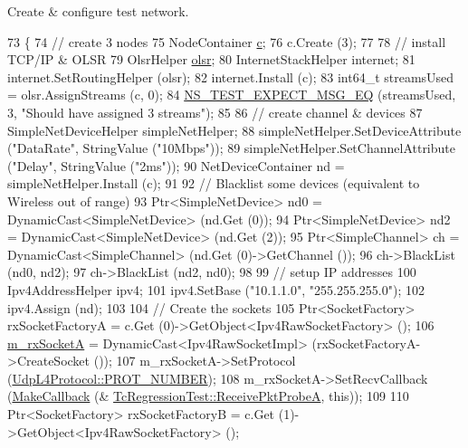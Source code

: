 Create \& configure test network. 


\begin{DoxyCode}
73 \{
74   \textcolor{comment}{// create 3 nodes}
75   NodeContainer \hyperlink{lte_2model_2fading-traces_2fading__trace__generator_8m_ae0323a9039add2978bf5b49550572c7c}{c};
76   c.Create (3);
77 
78   \textcolor{comment}{// install TCP/IP & OLSR}
79   OlsrHelper \hyperlink{namespaceolsr}{olsr};
80   InternetStackHelper internet;
81   internet.SetRoutingHelper (olsr);
82   internet.Install (c);
83   int64\_t streamsUsed = olsr.AssignStreams (c, 0);
84   \hyperlink{group__testing_ga7304ba46a28d8cf08dfdfd6499cf7068}{NS\_TEST\_EXPECT\_MSG\_EQ} (streamsUsed, 3, \textcolor{stringliteral}{"Should have assigned 3 streams"});
85 
86   \textcolor{comment}{// create channel & devices}
87   SimpleNetDeviceHelper simpleNetHelper;
88   simpleNetHelper.SetDeviceAttribute (\textcolor{stringliteral}{"DataRate"}, StringValue (\textcolor{stringliteral}{"10Mbps"}));
89   simpleNetHelper.SetChannelAttribute (\textcolor{stringliteral}{"Delay"}, StringValue (\textcolor{stringliteral}{"2ms"}));
90   NetDeviceContainer nd = simpleNetHelper.Install (c);
91 
92   \textcolor{comment}{// Blacklist some devices (equivalent to Wireless out of range)}
93   Ptr<SimpleNetDevice> nd0 = DynamicCast<SimpleNetDevice> (nd.Get (0));
94   Ptr<SimpleNetDevice> nd2 = DynamicCast<SimpleNetDevice> (nd.Get (2));
95   Ptr<SimpleChannel> ch = DynamicCast<SimpleChannel> (nd.Get (0)->GetChannel ());
96   ch->BlackList (nd0, nd2);
97   ch->BlackList (nd2, nd0);
98 
99   \textcolor{comment}{// setup IP addresses}
100   Ipv4AddressHelper ipv4;
101   ipv4.SetBase (\textcolor{stringliteral}{"10.1.1.0"}, \textcolor{stringliteral}{"255.255.255.0"});
102   ipv4.Assign (nd);
103 
104   \textcolor{comment}{// Create the sockets}
105   Ptr<SocketFactory> rxSocketFactoryA = c.Get (0)->GetObject<Ipv4RawSocketFactory> ();
106   \hyperlink{classns3_1_1olsr_1_1TcRegressionTest_accd5e6cfdc334e18e2aa762c34933d65}{m\_rxSocketA} = DynamicCast<Ipv4RawSocketImpl> (rxSocketFactoryA->CreateSocket ());
107   m\_rxSocketA->SetProtocol (\hyperlink{classns3_1_1UdpL4Protocol_ad370801b3d1a166e831020a777c41047}{UdpL4Protocol::PROT\_NUMBER});
108   m\_rxSocketA->SetRecvCallback (\hyperlink{group__makecallbackmemptr_ga9376283685aa99d204048d6a4b7610a4}{MakeCallback} (&
      \hyperlink{classns3_1_1olsr_1_1TcRegressionTest_ab21ef40dd3829ca85467f4eff91ab34a}{TcRegressionTest::ReceivePktProbeA}, \textcolor{keyword}{this}));
109 
110   Ptr<SocketFactory> rxSocketFactoryB = c.Get (1)->GetObject<Ipv4RawSocketFactory> ();

\end{DoxyCode}
